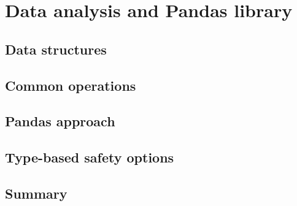 \chapter{Data analysis and Pandas library}

\section{Data structures}

\section{Common operations}

\section{Pandas approach}

\section{Type-based safety options}

\section*{Summary}
